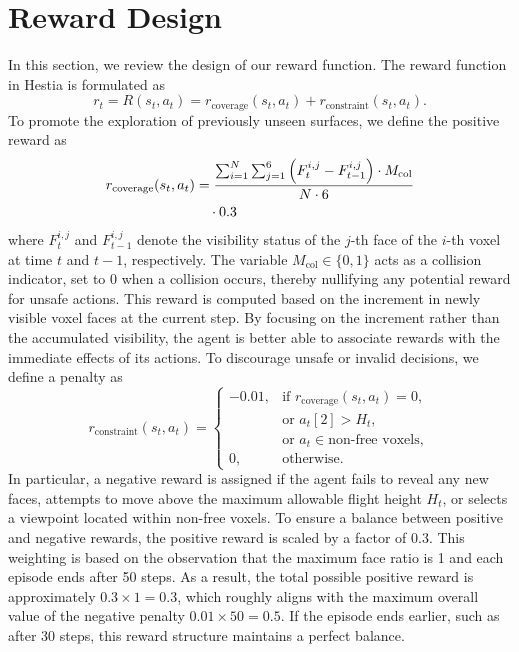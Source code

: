 \section{Reward Design}
\label{asec:rew}

In this section, we review the design of our reward function.
The reward function in Hestia is formulated as
\begin{equation}
r_t = R(s_t, a_t) = r_{\text{coverage}}(s_t, a_t) + r_{\text{constraint}}(s_t, a_t).
\end{equation}
To promote the exploration of previously unseen surfaces, we define the positive reward as
\begin{align}
r_{\text{coverage}}(s_t, a_t) 
&= \frac{\sum_{i=1}^N \sum_{j=1}^6 \left( F_t^{i,j} - F_{t-1}^{i,j} \right) \cdot M_{\text{col}}}{N \cdot 6} \notag \\
&\quad \cdot 0.3
\end{align}
where $F_t^{i,j}$ and $F_{t-1}^{i,j}$ denote the visibility status of the $j$-th face of the $i$-th voxel at time $t$ and $t-1$, respectively. 
The variable $M_{\text{col}} \in \{0, 1\}$ acts as a collision indicator, set to $0$ when a collision occurs, thereby nullifying any potential reward for unsafe actions.
This reward is computed based on the increment in newly visible voxel faces at the current step. 
By focusing on the increment rather than the accumulated visibility, the agent is better able to associate rewards with the immediate effects of its actions.
To discourage unsafe or invalid decisions, we define a penalty as
\begin{equation}
r_{\text{constraint}}(s_t, a_t) =
\begin{cases} 
-0.01, & \text{if } r_{\text{coverage}}(s_t, a_t) = 0, \\
       & \text{or } a_t[2] > H_t, \\
       & \text{or } a_t \in \text{non-free voxels}, \\
0,     & \text{otherwise.}
\end{cases}
\end{equation}
In particular, a negative reward is assigned if the agent fails to reveal any new faces, attempts to move above the maximum allowable flight height $H_t$, or selects a viewpoint located within non-free voxels.
To ensure a balance between positive and negative rewards, the positive reward is scaled by a factor of $0.3$.  
This weighting is based on the observation that the maximum face ratio is 1 and each episode ends after 50 steps.  
As a result, the total possible positive reward is approximately $0.3 \times 1 = 0.3$, which roughly aligns with the maximum overall value of the negative penalty $0.01 \times 50 = 0.5$.  
If the episode ends earlier, such as after 30 steps, this reward structure maintains a perfect balance.


